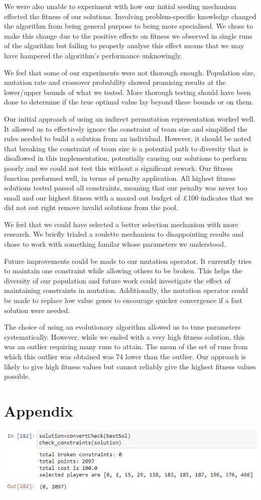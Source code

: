 \documentclass[11pt,a4paper]{article}
\begin{document}
We were also unable to experiment with how our initial seeding mechanism effected the fitness of our solutions. Involving problem-specific knowledge changed the algorithm from being general purpose to being more specialised. We chose to make this change due to the positive effects on fitness we observed in single runs of the algorithm but failing to properly analyse this effect means that we may have hampered the algorithm's performance unknowingly.

We feel that some of our experiments were not thorough enough. Population size, mutation rate and crossover probability showed promising results at the lower/upper bounds of what we tested. More thorough testing should have been done to determine if the true optimal value lay beyond these bounds or on them.

Our initial approach of using an indirect permutation representation worked well. It allowed us to effectively ignore the constraint of team size and simplified the rules needed to build a solution from an individual. However, it should be noted that breaking the constraint of team size is a potential path to diversity that is disallowed in this implementation, potentially causing our solutions to perform poorly and we could not test this without a significant rework.
Our fitness function performed well, in terms of penalty application. All highest fitness solutions tested passed all constraints, meaning that our penalty was never too small and our highest fitness with a maxed out budget of £100 indicates that we did not out right remove invalid solutions from the pool.

We feel that we could have selected a better selection mechanism with more research. We briefly trialed a roulette mechanism to disappointing results and chose to work with something familar whose parameters we understood.

Future improvements could be made to our mutation operator. It currently tries to maintain one constraint while allowing others to be broken. This helps the diversity of our population and future work could investigate the effect of maintaining constraints in mutation. Additionally, the mutation operator could be made to replace low value genes to encourage quicker convergence if a fast solution were needed.

The choice of using an evolutionary algorithm allowed us to tune parameters systematically. However, while we ended with a very high fitness solution, this was an outlier requiring many runs to attain. The mean of the set of runs from which this outlier was obtained was 74 lower than the outlier. Our approach is likely to give high fitness values but cannot reliably give the highest fitness values possible.

\section{Appendix}
\includegraphics[width=\textwidth]{bestSolution}
\label{appendix:a}


\end{document}
